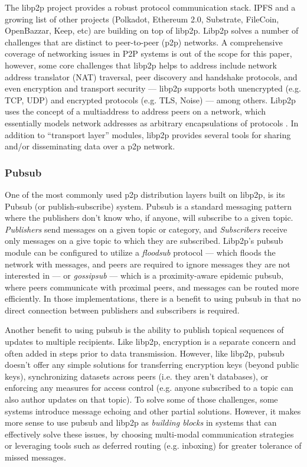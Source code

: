 \documentclass{textile}
\begin{document}
The libp2p project provides a robust protocol communication stack. IPFS and a growing list of other projects (Polkadot, Ethereum 2.0, Substrate, FileCoin, OpenBazzar, Keep, etc) are building on top of libp2p. Libp2p solves a number of challenges that are distinct to peer-to-peer (p2p) networks. A comprehensive coverage of networking issues in P2P systems is out of the scope for this paper, however, some core challenges that libp2p helps to address include network address translator \cite{srisureshIPNetworkAddress} (NAT) traversal, peer discovery and handshake protocols, and even encryption and transport security --- libp2p supports both unencrypted (e.g. TCP, UDP) and encrypted protocols (e.g. TLS, Noise) --- among others. Libp2p uses the concept of a multiaddress to address peers on a network, which essentially models network addresses as arbitrary encapsulations of protocols \cite{multiformatsMultiaddr}. In addition to ``transport layer'' modules, libp2p provides several tools for sharing and/or disseminating data over a p2p network.

\subsubsection{Pubsub}

One of the most commonly used p2p distribution layers built on libp2p, is its Pubsub (or publish-subscribe) system. Pubsub is a standard messaging pattern where the publishers don't know who, if anyone, will subscribe to a given topic. \emph{Publishers} send messages on a given topic or category, and \emph{Subscribers} receive only messages on a give topic to which they are subscribed. Libp2p's pubsub module can be configured to utilize a \emph{floodsub} protocol --- which floods the network with messages, and peers are required to ignore messages they are not interested in --- or \emph{gossipsub} --- which is a proximity-aware epidemic pubsub, where peers communicate with proximal peers, and messages can be routed more efficiently. In those implementations, there is a benefit to using pubsub in that no direct connection between publishers and subscribers is required.

Another benefit to using pubsub is the ability to publish topical sequences of updates to multiple recipients. Like libp2p, encryption is a separate concern and often added in steps prior to data transmission. However, like libp2p, pubsub doesn't offer any simple solutions for transferring encryption keys (beyond public keys), synchronizing datasets across peers (i.e. they aren't databases), or enforcing any measures for access control (e.g. anyone subscribed to a topic can also author updates on that topic). To solve some of those challenges, some systems introduce message echoing and other partial solutions. However, it makes more sense to use pubsub and libp2p as \emph{building blocks} in systems that can effectively solve these issues, by choosing multi-modal communication strategies or leveraging tools such as deferred routing (e.g. inboxing) for greater tolerance of missed messages.
\end{document}
